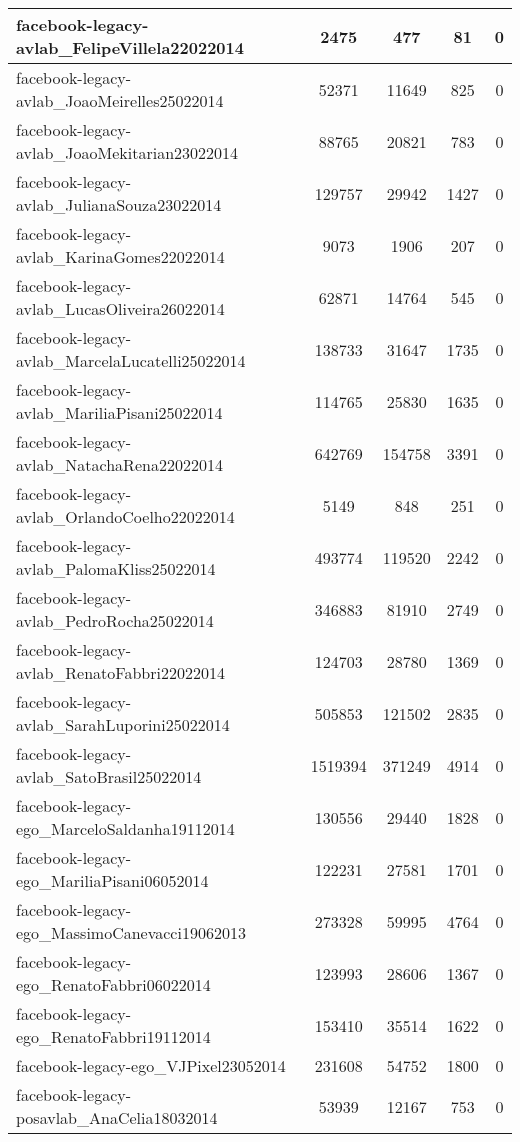 \begin{center}
\begin{longtable}{| l | c | c | c | c |}
facebook-legacy-avlab\_FelipeVillela22022014 & 2475  & 477  & 81  & 0 \\\hline
facebook-legacy-avlab\_JoaoMeirelles25022014 & 52371  & 11649  & 825  & 0 \\\hline
facebook-legacy-avlab\_JoaoMekitarian23022014 & 88765  & 20821  & 783  & 0 \\\hline
facebook-legacy-avlab\_JulianaSouza23022014 & 129757  & 29942  & 1427  & 0 \\\hline
facebook-legacy-avlab\_KarinaGomes22022014 & 9073  & 1906  & 207  & 0 \\\hline
facebook-legacy-avlab\_LucasOliveira26022014 & 62871  & 14764  & 545  & 0 \\\hline
facebook-legacy-avlab\_MarcelaLucatelli25022014 & 138733  & 31647  & 1735  & 0 \\\hline
facebook-legacy-avlab\_MariliaPisani25022014 & 114765  & 25830  & 1635  & 0 \\\hline
facebook-legacy-avlab\_NatachaRena22022014 & 642769  & 154758  & 3391  & 0 \\\hline
facebook-legacy-avlab\_OrlandoCoelho22022014 & 5149  & 848  & 251  & 0 \\\hline
facebook-legacy-avlab\_PalomaKliss25022014 & 493774  & 119520  & 2242  & 0 \\\hline
facebook-legacy-avlab\_PedroRocha25022014 & 346883  & 81910  & 2749  & 0 \\\hline
facebook-legacy-avlab\_RenatoFabbri22022014 & 124703  & 28780  & 1369  & 0 \\\hline
facebook-legacy-avlab\_SarahLuporini25022014 & 505853  & 121502  & 2835  & 0 \\\hline
facebook-legacy-avlab\_SatoBrasil25022014 & 1519394  & 371249  & 4914  & 0 \\\hline
facebook-legacy-ego\_MarceloSaldanha19112014 & 130556  & 29440  & 1828  & 0 \\\hline
facebook-legacy-ego\_MariliaPisani06052014 & 122231  & 27581  & 1701  & 0 \\\hline
facebook-legacy-ego\_MassimoCanevacci19062013 & 273328  & 59995  & 4764  & 0 \\\hline
facebook-legacy-ego\_RenatoFabbri06022014 & 123993  & 28606  & 1367  & 0 \\\hline
facebook-legacy-ego\_RenatoFabbri19112014 & 153410  & 35514  & 1622  & 0 \\\hline
facebook-legacy-ego\_VJPixel23052014 & 231608  & 54752  & 1800  & 0 \\\hline
facebook-legacy-posavlab\_AnaCelia18032014 & 53939  & 12167  & 753  & 0 \\\hline

\end{longtable}
\end{center}
